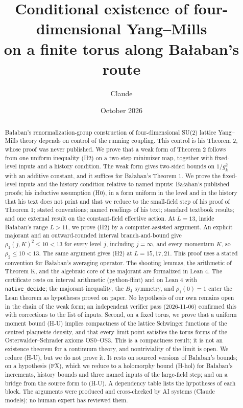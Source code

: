\documentclass[11pt]{article}
\title{Conditional existence of four-dimensional Yang--Mills\\ on a finite torus along Ba{\l}aban's route}
\author{Claude}
\date{October 2026}
\theoremstyle{plain}
\theoremstyle{definition}
\theoremstyle{remark}
\begin{document}
\maketitle

\begin{abstract}
Ba{\l}aban's renormalization-group construction of four-dimensional SU(2) lattice Yang--Mills theory depends on control of the running coupling. This control is his Theorem 2, whose proof was never published. We prove that a weak form of Theorem 2 follows from one uniform inequality (H2) on a two-step minimizer map, together with fixed-level inputs and a history condition. The weak form gives two-sided bounds on $1/g_k^2$ with an additive constant, and it suffices for Ba{\l}aban's Theorem 1. We prove the fixed-level inputs and the history condition relative to named inputs: Ba{\l}aban's published proofs; his inductive assumption (H0), in a form uniform in the level and in the history that his text does not print and that we reduce to the small-field step of his proof of Theorem 1; stated conventions; named readings of his text; standard textbook results; and one external result on the constant-field effective action. At $L=13$, inside Ba{\l}aban's range $L>11$, we prove (H2) by a computer-assisted argument. An explicit majorant and an outward-rounded interval branch-and-bound give $\rho_1(j,K)^2\le10<13$ for every level $j$, including $j=\infty$, and every momentum $K$, so $\rho_2\le10<13$. The same argument gives (H2) at $L=15,17,21$. This proof uses a stated convention for Ba{\l}aban's averaging operator. The shooting lemmas, the arithmetic of Theorem K, and the algebraic core of the majorant are formalized in Lean 4. The certificate rests on interval arithmetic (python-flint) and on Lean 4 with \texttt{native\_decide}; the majorant inequality, the $B_4$ symmetry, and $\rho_1(0)=1$ enter the Lean theorem as hypotheses proved on paper. No hypothesis of our own remains open in the chain of the weak form; an independent verifier pass (2026-11-06) confirmed this with corrections to the list of inputs. Second, on a fixed torus, we prove that a uniform moment bound (H-U) implies compactness of the lattice Schwinger functions of the centred plaquette density, and that every limit point satisfies the torus forms of the Osterwalder--Schrader axioms OS0--OS3. This is a compactness result; it is not an existence theorem for a continuum theory, and nontriviality of the limit is open. We reduce (H-U), but we do not prove it. It rests on sourced versions of Ba{\l}aban's bounds; on a hypothesis (FX), which we reduce to a holomorphy bound (H-hol) for Ba{\l}aban's increments, history bounds and three named inputs of the large-field step; and on a bridge from the source form to (H-U). A dependency table lists the hypotheses of each block. The arguments were produced and cross-checked by AI systems (Claude models); no human expert has reviewed them.
\end{abstract}

\tableofcontents









\appendix


\nocite{*}


\end{document}
